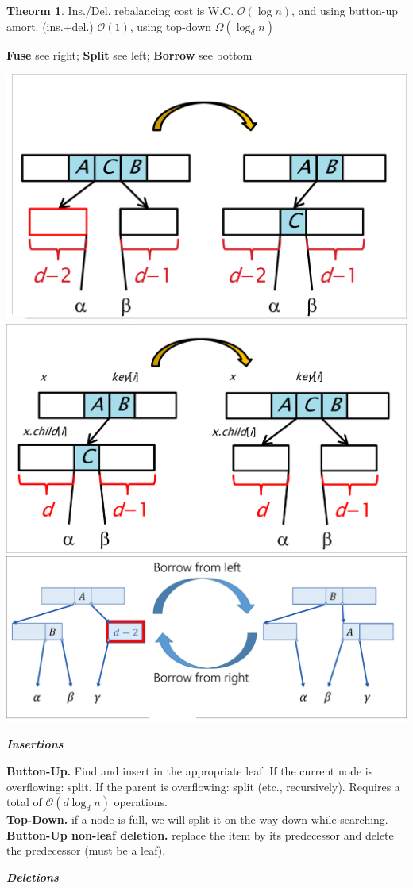 \documentclass[]{article}
\theoremstyle{definition}
\newtheorem{Theorem}{\color{theoColor}Theorm}
\newcommand\theo  [1] {\begin{Theorem}#1\end{Theorem}}
\newcommand\oc    {\mathcal{O}}
\newcommand\logn      {\log n}
\begin{document}
\begin{multicols}{4}
				\theo{Ins./Del. rebalancing cost is W.C. $\oc(\logn)$, and using button-up amort. (ins.+del.) $\oc(1)$, using top-down $\Omega(\log_dn)$}
				\textbf{Fuse} see right; \textbf{Split} see left; \textbf{Borrow} see bottom \\
				\vspace{-8pt}\begin{center}
					\includegraphics[width=0.45\linewidth]{images/fuse}
					\includegraphics[width=0.485\linewidth]{images/splits} \\
					\includegraphics[width=0.6\linewidth]{images/borrow}
				\end{center}\vspace{-5pt}
				
				\quad\textbf{\textit{Insertions}}
				
					\textbf{Button-Up. }Find and insert in the appropriate leaf. If the current node is overflowing: split. If the parent is overflowing: split (etc., recursively). Requires a total of $\oc(d \log_dn)$ operations. \\
					\textbf{Top-Down. }if a node is full, we will split it on the way down while searching. \\
					\textbf{Button-Up non-leaf deletion. }replace the item by its predecessor and delete the predecessor (must be a leaf). 
				
				\quad\textbf{\textit{Deletions}}
				

\end{multicols}
\end{document}
